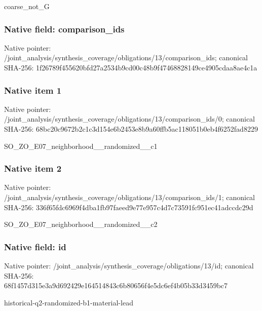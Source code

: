 \documentclass[10pt,a4paper]{article}
\begin{document}
\begingroup\raggedright\sloppy coarse\_\allowbreak{}not\_\allowbreak{}G\par\endgroup

\subsubsection{Native field: comparison\_\allowbreak{}ids}
Native pointer: /joint\_\allowbreak{}analysis/synthesis\_\allowbreak{}coverage/obligations/13/comparison\_\allowbreak{}ids; canonical SHA-256: 1f26789f455620bfd27a2534b9cd00c48b9f47468828149ce4905cdaa8ae4c1a

\subsubsection{Native item 1}
Native pointer: /joint\_\allowbreak{}analysis/synthesis\_\allowbreak{}coverage/obligations/13/comparison\_\allowbreak{}ids/0; canonical SHA-256: 68bc20c9672b2c1c3d154e6b2453e8b9a60ffb5ac118051b0eb4f6252fad8229

\begingroup\raggedright\sloppy SO\_\allowbreak{}ZO\_\allowbreak{}E07\_\allowbreak{}neighborhood\_\allowbreak{}\_\allowbreak{}randomized\_\allowbreak{}\_\allowbreak{}c1\par\endgroup

\subsubsection{Native item 2}
Native pointer: /joint\_\allowbreak{}analysis/synthesis\_\allowbreak{}coverage/obligations/13/comparison\_\allowbreak{}ids/1; canonical SHA-256: 336f65fdc6969f4dba1fb97faeed9e77e957c4d7c73591fc951ec41adccdc29d

\begingroup\raggedright\sloppy SO\_\allowbreak{}ZO\_\allowbreak{}E07\_\allowbreak{}neighborhood\_\allowbreak{}\_\allowbreak{}randomized\_\allowbreak{}\_\allowbreak{}c2\par\endgroup

\subsubsection{Native field: id}
Native pointer: /joint\_\allowbreak{}analysis/synthesis\_\allowbreak{}coverage/obligations/13/id; canonical SHA-256: 68f1457d315e3a9d692429e164514843c6b80656f4e5dc6ef4b05b33d3459bc7

\begingroup\raggedright\sloppy historical-q2-randomized-b1-material-lead\par\endgroup
\end{document}
